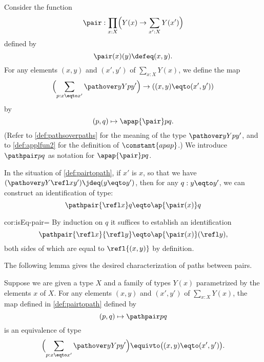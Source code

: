 \begin{definition}
{}
  Consider the function
  \[
    \pair : \prod_{x:X} \Bigl( Y(x) \to \sum _{x':X} Y(x') \Bigr)
  \]
  defined by
  \[
    \pair(x)(y) \defeq (x,y).
  \]
  For any elements $(x,y)$ and $(x',y')$ of $\sum _{x:X} Y(x)$, we define the map
  \[
    \Bigl( \sum_{p:x \eqto x'} \pathover y Y p {y'} \Bigr)
    \to \left ( (x,y) \eqto (x',y') \right )
  \]
  by
  \[
    (p,q) \mapsto \apap {\pair} p q.
  \]
  (Refer to \cref{def:pathsoverpaths} for the meaning of the type $\pathover y Y p {y'}$, and to \cref{def:applfun2} for the definition of $\constant{apap}$.)
  We introduce $\pathpair p q$ as notation for $\apap {\pair} p q$.
\end{definition}

\begin{construction}\label{cor:isEq-pair=}
  In the situation of \cref{def:pairtopath}, if $x'$ is $x$,
  so that we have $( \pathover y Y {\refl x} {y'} ) \jdeq ( y \eqto y' )$,
  then for any $q : y \eqto y'$, we can construct an identification of type:
  \[
    \pathpair {\refl x} q \eqto \ap {\pair (x)} q
  \]
\end{construction}

\begin{implementation}{cor:isEq-pair=}
  By induction on $q$ it suffices to establish an identification
  \[
    \pathpair {\refl x} {\refl y} \eqto \ap {\pair (x)} (\refl y),
  \]
  both sides of which are
  equal to $\refl {(x,y)}$ by definition.
\end{implementation}

The following lemma gives the desired characterization of paths between pairs.

\begin{lemma}\label{lem:isEq-pair=}
  Suppose we are given a type $X$ and a family of types $Y(x)$ parametrized by the elements $x$ of $X$.
  For any elements $(x,y)$ and $(x',y')$ of $\sum _{x:X} Y(x)$,
  the map defined in \cref{def:pairtopath} defined by
  \[
    (p,q) \mapsto \pathpair p q
  \]
  is an equivalence of type
  \[
    \Bigl( \sum_{p:x \eqto x'} \pathover y Y p {y'} \Bigr)
    \equivto \bigl( (x,y) \eqto (x',y') \bigr).
  \]
\end{lemma}

